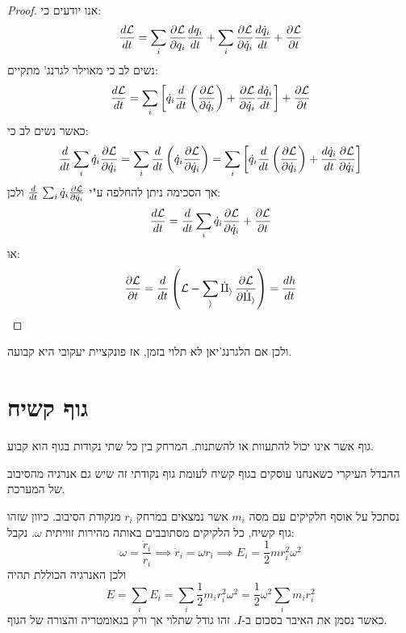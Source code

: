 \documentclass{tstextbook}
\begin{document}
\begin{proof}
אנו יודעים כי:
$${\frac{d \mathcal{L}}{d t}}=\sum_{i}{\frac{\partial \cal L}{\partial q_{i}}}{\frac{d q_{i}}{d t}}+\sum_{i}{\frac{\partial \cal L}{\partial{\dot{q}}_{i}}}{\frac{d{\dot{q}}_{i}}{d t}}+{\frac{\partial \cal L}{\partial t}}$$
נשים לב כי מאוילר לגרנג' מתקיים:
$${\frac{d \cal L}{d t}}=\sum_{i}\left[{\dot{q}}_{i}{\frac{d}{d t}}\left({\frac{\partial \cal L}{\partial{\dot{q}}_{i}}}\right)+{\frac{\partial \cal L}{\partial{\dot{q}}_{i}}}{\frac{d{\dot{q}}_{i}}{d t}}\right]+{\frac{\partial \cal L}{\partial t}}$$
כאשר נשים לב כי:
$${\frac{d}{d t}}\sum_{i}{\dot{q}}_{i}{\frac{\partial \cal L}{\partial{\dot{q}}_{i}}}=\sum_{i}{\frac{d}{d t}}\left({\dot{q}}_{i}{\frac{\partial \cal L}{\partial{\dot{q}}_{i}}}\right)=\sum_{i}\left[{\dot{q}}_{i}{\frac{d}{d t}}\left({\frac{\partial \cal L}{\partial{\dot{q}}_{i}}}\right)+{\frac{d{\dot{q}}_{i}}{d t}}{\frac{\partial \cal L}{\partial{\dot{q}}_{i}}}\right]$$
אך הסכימה ניתן להחלפה ע"י \(\frac{d}{d t}\,\sum_{i}\dot{q}_{i}\frac{\partial \cal L}{\partial\dot{q}_{i}}\) ולכן:
$${\frac{d \cal L}{d t}}={\frac{d}{d t}}\sum_{i}{\dot{q}}_{i}{\frac{\partial \cal L}{\partial{\dot{q}}_{i}}}+{\frac{\partial \cal L}{\partial t}}$$
או:
$${\frac{\partial \cal L}{\partial t}}={\frac{d}{d t}}\left(\cal L-\sum_{i}{\dot{q}}_{i}\,{\frac{\partial \cal L}{\partial{\dot{q}}_{i}}}\right)=\frac{dh}{dt}$$

\end{proof}
ולכן אם הלגרנג'יאן לא תלוי בזמן, אז פונקציית יעקובי היא קבועה.

\section{גוף קשיח}

\begin{definition}
גוף אשר אינו יכול להתעוות או להשתנות. המרחק בין כל שתי נקודות בגוף הוא קבוע.

\end{definition}
ההבדל העיקרי כשאנחנו עוסקים בגוף קשיח לעומת גוף נקודתי זה שיש גם אנרגיה מהסיבוב של המערכת.

נסתכל על אוסף חלקיקים עם מסה \(m_{i}\) אשר נמצאים במרחק \(r_{i}\) מנקודת הסיבוב. כיוון שזהו גוף קשיח, כל הלקיקים מסתובבים באותה מהירות זוויתית \(\omega\). נקבל:
$$\omega=\frac{\dot{r}_{i}}{r_{i}}\implies \dot{r}_{i}=\omega r_{i}\implies E_{i}=\frac{1}{2}mr_{i}^2\omega^2$$
ולכן האנרגיה הכוללת תהיה
$$E=\sum_{i}E_{i}=\sum_{i} \frac{1}{2}m_{i}r_{i}^2\omega^2=\frac{1}{2}\omega^2 \sum_{i}m_{i}r_{i}^2 $$
כאשר נסמן את האיבר בסכום ב-\(I\).  זהו גודל שתלוי אך ורק בגאומטריה והצורה של הגוף.
\end{document}
